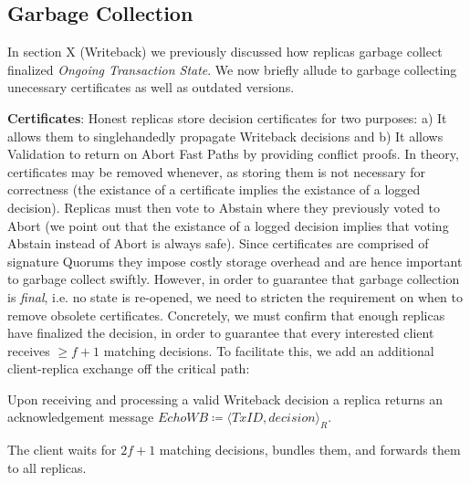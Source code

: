 \subsection{Garbage Collection}
In section X (Writeback) we previously discussed how replicas garbage collect finalized \textit{Ongoing Transaction State}. We now briefly allude to garbage collecting unecessary certificates as well as outdated versions.

\textbf{Certificates}: Honest replicas store decision certificates for two purposes: a) It allows them to singlehandedly propagate Writeback decisions and b) It allows Validation to return on Abort Fast Paths by providing conflict proofs. In theory, certificates may be removed whenever, as storing them is not necessary for correctness (the existance of a certificate implies the existance of a logged decision). Replicas must then vote to Abstain where they previously voted to Abort (we point out that the existance of a logged decision implies that voting Abstain instead of Abort is always safe). Since certificates are comprised of signature Quorums they impose costly storage overhead and are hence important to garbage collect swiftly.
However, in order to guarantee that garbage collection is \textit{final}, i.e. no state is re-opened, we need to stricten the requirement on when to remove obsolete certificates. Concretely, we must confirm that enough replicas have finalized the decision, in order to guarantee that every interested client receives $\geq f+1$ matching decisions.  To facilitate this, we add an additional client-replica exchange off the critical path:

Upon receiving and processing a valid Writeback decision a replica returns an acknowledgement message $EchoWB \coloneqq \langle TxID, decision \rangle_R$.

The client waits for $2f+1$ matching decisions, bundles them, and forwards them to all replicas.

